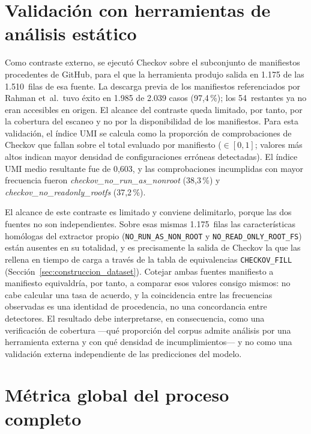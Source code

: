 \section{Validación con herramientas de análisis estático}
\label{sec:validacion_externa}

Como contraste externo, se ejecutó Checkov \citep{Checkov2021} sobre el
subconjunto de manifiestos procedentes de GitHub, para el que la herramienta
produjo salida en 1.175 de las 1.510~filas de esa fuente. La descarga previa de
los manifiestos referenciados por Rahman et~al.\ tuvo éxito en 1.985 de 2.039
casos (97,4\,\%); los 54~restantes ya no eran accesibles en origen. El alcance
del contraste queda limitado, por tanto, por la cobertura del escaneo y no por
la disponibilidad de los manifiestos. Para esta validación, el índice \ac{UMI} se calcula como la
proporción de comprobaciones de Checkov que fallan sobre el total
evaluado por manifiesto (\(\in [0,1]\); valores más altos indican mayor densidad
de configuraciones erróneas detectadas). El índice \ac{UMI} medio resultante fue de
0,603, y las comprobaciones incumplidas con mayor frecuencia fueron
\textit{checkov\_no\_run\_as\_nonroot} (38,3\,\%) y
\textit{checkov\_no\_readonly\_rootfs} (37,2\,\%).

El alcance de este contraste es limitado y conviene delimitarlo, porque las dos
fuentes no son independientes. Sobre esas mismas 1.175~filas las características
homólogas del extractor propio (\texttt{NO\_RUN\_AS\_NON\_ROOT} y
\texttt{NO\_READ\_ONLY\_ROOT\_FS}) están ausentes en su totalidad, y es
precisamente la salida de Checkov la que las rellena en tiempo de carga
a través de la tabla de equivalencias \texttt{CHECKOV\_FILL}
(Sección~\ref{sec:construccion_dataset}). Cotejar ambas fuentes manifiesto a
manifiesto equivaldría, por tanto, a comparar esos valores consigo mismos: no
cabe calcular una tasa de acuerdo, y la coincidencia entre las frecuencias
observadas es una identidad de procedencia, no una concordancia entre
detectores. El resultado debe interpretarse, en consecuencia, como una
verificación de cobertura —qué proporción del corpus admite análisis por una
herramienta externa y con qué densidad de incumplimientos— y no como una
validación externa independiente de las predicciones del modelo.

\section{Métrica global del proceso completo}
\label{sec:metrica_global}

